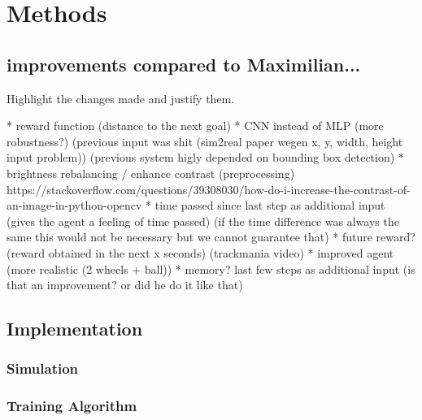\chapter{Methods}
\label{cha:Methods}





\section{improvements compared to Maximilian...}

Highlight the changes made and justify them.

* reward function (distance to the next goal)
* CNN instead of MLP (more robustness?) (previous input was shit (sim2real paper wegen x, y, width, height input problem)) (previous system higly depended on bounding box detection)
* brightness rebalancing / enhance contrast (preprocessing) https://stackoverflow.com/questions/39308030/how-do-i-increase-the-contrast-of-an-image-in-python-opencv
* time passed since last step as additional input (gives the agent a feeling of time passed) (if the time difference was always the same this would not be necessary but we cannot guarantee that)
* future reward? (reward obtained in the next x seconds) (trackmania video)
* improved agent (more realistic (2 wheels + ball))
* memory? last few steps as additional input (is that an improvement? or did he do it like that)


\section{Implementation}
\subsection{Simulation}

\subsection{Training Algorithm}



